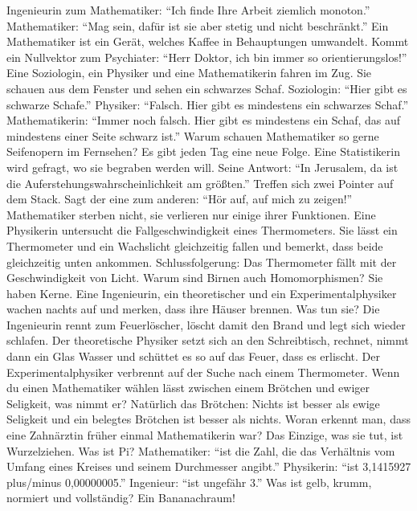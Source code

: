 {	\or Ingenieurin zum Mathematiker: \enquote{Ich finde Ihre Arbeit ziemlich monoton.} Mathematiker: \enquote{Mag sein, dafür ist sie aber stetig und nicht beschränkt.}
	\or Ein Mathematiker ist ein Gerät, welches Kaffee in Behauptungen umwandelt.
	\or Kommt ein Nullvektor zum Psychiater: \enquote{Herr Doktor, ich bin immer so orientierungslos!}
	\or Eine Soziologin, ein Physiker und eine Mathematikerin fahren im Zug. Sie schauen aus dem Fenster und sehen ein schwarzes Schaf. Soziologin: \enquote{Hier gibt es schwarze Schafe.} Physiker: \enquote{Falsch. Hier gibt es mindestens ein schwarzes Schaf.} Mathematikerin: \enquote{Immer noch falsch. Hier gibt es mindestens ein Schaf, das auf mindestens einer Seite schwarz ist.}
	\or Warum schauen Mathematiker so gerne Seifenopern im Fernsehen? Es gibt jeden Tag eine neue Folge.
	\or Eine Statistikerin wird gefragt, wo sie begraben werden will. Seine Antwort: \enquote{In Jerusalem, da ist die Auferstehungswahrscheinlichkeit am größten.}
	\or Treffen sich zwei Pointer auf dem Stack. Sagt der eine zum anderen: \enquote{Hör auf, auf mich zu zeigen!}
	\or Mathematiker sterben nicht, sie verlieren nur einige ihrer Funktionen.
	\or Eine Physikerin untersucht die Fallgeschwindigkeit eines Thermometers. Sie lässt ein Thermometer und ein Wachslicht gleichzeitig fallen und bemerkt, dass beide gleichzeitig unten ankommen. Schlussfolgerung: Das Thermometer fällt mit der Geschwindigkeit von Licht.
	\or Warum sind Birnen auch Homomorphismen? Sie haben Kerne.
	\or Eine Ingenieurin, ein theoretischer und ein Experimentalphysiker wachen nachts auf und merken, dass ihre Häuser brennen. Was tun sie? Die Ingenieurin rennt zum Feuerlöscher, löscht damit den Brand und legt sich wieder schlafen. Der theoretische Physiker setzt sich an den Schreibtisch, rechnet, nimmt dann ein Glas Wasser und schüttet es so auf das Feuer, dass es erlischt. Der Experimentalphysiker verbrennt auf der Suche nach einem Thermometer.
	\or Wenn du einen Mathematiker wählen lässt zwischen einem Brötchen und ewiger Seligkeit, was nimmt er? Natürlich das Brötchen: Nichts ist besser als ewige Seligkeit und ein belegtes Brötchen ist besser als nichts.
	\or Woran erkennt man, dass eine Zahnärztin früher einmal Mathematikerin war? Das Einzige, was sie tut, ist Wurzelziehen.
	\or Was ist Pi? Mathematiker: \enquote{\pi ist die Zahl, die das Verhältnis vom Umfang eines Kreises und seinem Durchmesser angibt.} Physikerin: \enquote{\pi ist 3,1415927 plus/minus 0,00000005.} Ingenieur: \enquote{\pi ist ungefähr 3.}
	\or Was ist gelb, krumm, normiert und vollständig? Ein Bananachraum!
}
